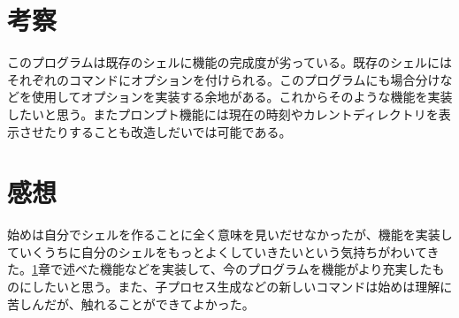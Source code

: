 \documentclass{procreport}
\begin{document}
\section{考察}
\label{sec:kousatsu}
このプログラムは既存のシェルに機能の完成度が劣っている。既存のシェルにはそれぞれのコマンドにオプションを付けられる。このプログラムにも場合分けなどを使用してオプションを実装する余地がある。これからそのような機能を実装したいと思う。またプロンプト機能には現在の時刻やカレントディレクトリを表示させたりすることも改造しだいでは可能である。


\section{感想}
始めは自分でシェルを作ることに全く意味を見いだせなかったが、機能を実装していくうちに自分のシェルをもっとよくしていきたいという気持ちがわいてきた。\ref{sec:kousatsu}章で述べた機能などを実装して、今のプログラムを機能がより充実したものにしたいと思う。また、子プロセス生成などの新しいコマンドは始めは理解に苦しんだが、触れることができてよかった。



\appendix
\newpage
\end{document}
